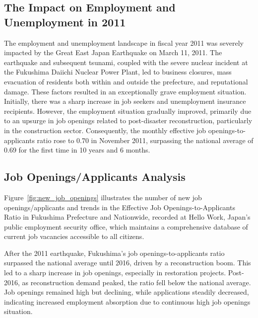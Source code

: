 \documentclass[12pt,halfline,a4paper]{ouparticle}
\begin{document}


\subsection{The Impact on Employment and Unemployment in 2011}
\label{sec4.1}

The employment and unemployment landscape in fiscal year 2011 was severely impacted by the Great East Japan Earthquake on March 11, 2011. The earthquake and subsequent tsunami, coupled with the severe nuclear incident at the Fukushima Daiichi Nuclear Power Plant, led to business closures, mass evacuation of residents both within and outside the prefecture, and reputational damage. These factors resulted in an exceptionally grave employment situation. Initially, there was a sharp increase in job seekers and unemployment insurance recipients. However, the employment situation gradually improved, primarily due to an upsurge in job openings related to post-disaster reconstruction, particularly in the construction sector. Consequently, the monthly effective job openings-to-applicants ratio rose to 0.70 in November 2011, surpassing the national average of 0.69 for the first time in 10 years and 6 months.


\subsection{Job Openings/Applicants Analysis}
\label{sec4.1}

Figure~\ref{fig:new_job_openings} illustrates the number of new job openings/applicants and trends in the Effective Job Openings-to-Applicants Ratio in Fukushima Prefecture and Nationwide, recorded at Hello Work, Japan’s public employment security office, which maintains a comprehensive database of current job vacancies accessible to all citizens. 

After the 2011 earthquake, Fukushima's job openings-to-applicants ratio surpassed the national average until 2016, driven by a reconstruction boom. This led to a sharp increase in job openings, especially in restoration projects. Post-2016, as reconstruction demand peaked, the ratio fell below the national average. Job openings remained high but declining, while applications steadily decreased, indicating increased employment absorption due to continuous high job openings situation.
\end{document}
